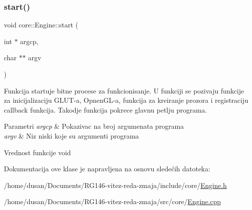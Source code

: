 \subsubsection{\texorpdfstring{start()}{start()}}
{\footnotesize\ttfamily void core\+::\+Engine\+::start (\begin{DoxyParamCaption}\item[{int $\ast$}]{argcp,  }\item[{char $\ast$$\ast$}]{argv }\end{DoxyParamCaption})}



Funkcija startuje bitne procese za funkcionisanje. U funkciji se pozivaju funkcije za inicijalizaciju G\+L\+U\+T-\/a, Opnen\+G\+L-\/a, funkcija za kreiranje prozora i registraciju callback funkcija. Takodje funkcija pokrece glavnu petlju programa. 


\begin{DoxyParams}{Parametri}
{\em argcp} & Pokazivac na broj argumenata programa \\
\hline
{\em argv} & Niz niski koje su argumenti programa \\
\hline
\end{DoxyParams}
\begin{DoxyReturn}{Vrednost funkcije}
void 
\end{DoxyReturn}


Dokumentacija ove klase je napravljena na osnovu sledećih datoteka\+:\begin{DoxyCompactItemize}
\item 
/home/dusan/\+Documents/\+R\+G146-\/vitez-\/reda-\/zmaja/include/core/\hyperlink{Engine_8h}{Engine.\+h}\item 
/home/dusan/\+Documents/\+R\+G146-\/vitez-\/reda-\/zmaja/src/core/\hyperlink{Engine_8cpp}{Engine.\+cpp}\end{DoxyCompactItemize}
